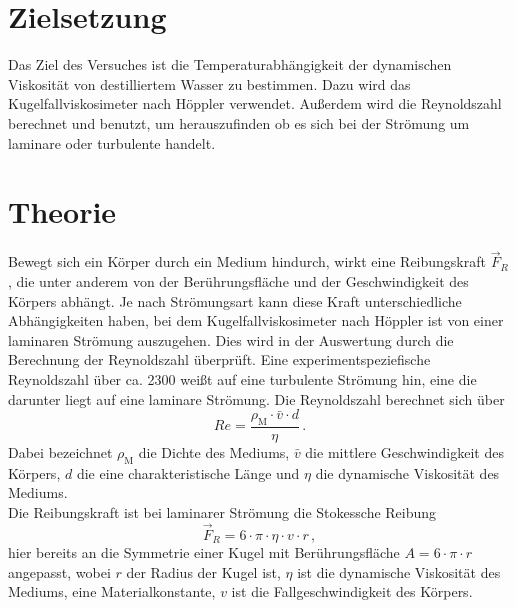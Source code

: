 \section{Zielsetzung}
\label{sec:Zielsetzung}
Das Ziel des Versuches ist die Temperaturabhängigkeit der dynamischen 
Viskosität von destilliertem Wasser zu bestimmen. Dazu wird das 
Kugelfallviskosimeter nach Höppler verwendet. Außerdem wird die Reynoldszahl 
berechnet und benutzt, um herauszufinden ob es sich bei der Strömung um 
laminare oder turbulente handelt. 
%
%
%
\section{Theorie}
\label{sec:Theorie}
Bewegt sich ein Körper durch ein Medium hindurch, wirkt eine Reibungskraft 
$\vec{F}_{R}$, die unter anderem von der Berührungsfläche und der Geschwindigkeit
des Körpers abhängt. Je nach Strömungsart kann diese Kraft 
unterschiedliche Abhängigkeiten haben, bei dem Kugelfallviskosimeter nach 
Höppler ist von einer laminaren Strömung auszugehen. 
Dies wird in der Auswertung durch die
Berechnung der Reynoldszahl überprüft. Eine experimentspeziefische 
Reynoldszahl über ca. 2300 weißt auf eine turbulente Strömung hin, eine die
darunter liegt auf eine laminare Strömung. Die Reynoldszahl berechnet sich
über 
\begin{equation}
    Re = \frac{\rho_{\text{M}} \cdot \bar{v} \cdot d}{\eta}\,. 
    \label{equ:Reynoldszahl}
\end{equation}
Dabei bezeichnet $\rho_{\text{M}}$ die Dichte des Mediums, $\bar{v}$
die mittlere Geschwindigkeit des Körpers, $d$ die eine charakteristische 
Länge und $\eta$ die dynamische Viskosität des Mediums. \\
Die Reibungskraft ist bei laminarer Strömung die Stokessche Reibung
\begin{equation}
    \vec{F}_{R} = 6 \cdot \pi \cdot \eta \cdot v \cdot r \, , 
    \label{equ:Stokesreibungskraft}
\end{equation}
hier bereits an die Symmetrie einer Kugel mit Berührungsfläche 
$A = 6 \cdot \pi \cdot r$ angepasst, wobei $r$ der Radius der Kugel ist, 
$\eta$ ist die dynamische Viskosität des Mediums, eine Materialkonstante,
$v$ ist die Fallgeschwindigkeit des Körpers. \\
%
%
%
